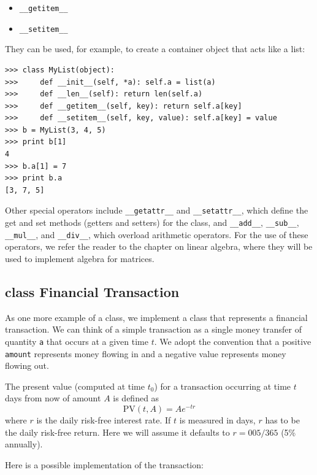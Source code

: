 \documentclass[justified,sixbynine]{tufte-book}
\def\ft{\small\tt}
\theoremstyle{plain}%
\theoremstyle{definition}
\theoremstyle{remark}
\begin{document}
\begin{fullwidth}
\begin{itemize}
\item {\ft \_\_getitem\_\_}

\item {\ft \_\_setitem\_\_}
\end{itemize}
They can be used, for example, to create a container object that acts like a list:
\begin{lstlisting}
>>> class MyList(object):
>>>     def __init__(self, *a): self.a = list(a)
>>>     def __len__(self): return len(self.a)
>>>     def __getitem__(self, key): return self.a[key]
>>>     def __setitem__(self, key, value): self.a[key] = value
>>> b = MyList(3, 4, 5)
>>> print b[1]
4
>>> b.a[1] = 7
>>> print b.a
[3, 7, 5]
\end{lstlisting}

Other special operators include {\ft \_\_getattr\_\_} and {\ft \_\_setattr\_\_}, which define the get and set methods (getters and setters) for the class, and {\ft \_\_add\_\_}, {\ft \_\_sub\_\_}, {\ft \_\_mul\_\_}, and {\ft \_\_div\_\_}, which overload arithmetic operators. For the use of these operators, we refer the reader to the chapter on linear algebra, where they will be used to implement algebra for matrices.

\goodbreak\subsection{class Financial Transaction}


As one more example of a class, we implement a class that represents a financial transaction. We can think of a simple transaction as a single money transfer of quantity {\ft a} that occurs at a given time $t$. We adopt the convention that a positive {\ft amount} represents money flowing in and a negative value represents money flowing out.

The present value (computed at time $t_0$) for a transaction occurring at time $t$ days from now of amount $A$ is defined as
\begin{equation}
\textrm{PV}(t,A) = A e^{-t r}
\end{equation}
where $r$ is the daily risk-free interest rate. If $t$ is measured in days, $r$ has to be the daily risk-free return. Here we will assume it defaults to $r=005/365$ (5\% annually).


Here is a possible implementation of the transaction:


\end{fullwidth}
\end{document}
